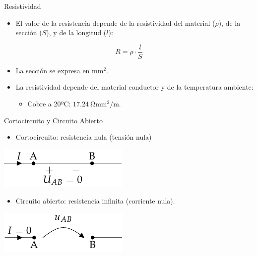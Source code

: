 \documentclass[xcolor={usenames,svgnames,dvipsnames}]{beamer}
\begin{document}
\begin{frame}[label={sec:org91b3831}]{Resistividad}
\begin{itemize}
\item El valor de la resistencia depende de la \alert{resistividad del material} (\(\rho\)), de la \alert{sección} (\(S\)), y de la
longitud (\(l\)):
\end{itemize}
\begin{equation*}
  R = \rho \cdot \frac{l}{S}
\end{equation*}

\begin{itemize}
\item La \alert{sección} se expresa en \(\si{\milli\meter\squared}\).

\item La \alert{resistividad} depende del material conductor y de la temperatura ambiente:

\begin{itemize}
\item Cobre a 20ºC: \(\SI{17.24}{\ohm\milli\meter\squared\per\meter}\).
\end{itemize}
\end{itemize}
\end{frame}

\begin{frame}[label={sec:org7a2adb9}]{Cortocircuito y Circuito Abierto}
\begin{itemize}
\item Cortocircuito: resistencia nula (tensión nula)
\end{itemize}

\begin{center}
\includegraphics[height=0.2\textheight]{figs/Cortocircuito.pdf}
\end{center}

\begin{itemize}
\item Circuito abierto: resistencia infinita (corriente nula).
\end{itemize}

\begin{center}
\includegraphics[height=0.2\textheight]{figs/CircuitoAbierto.pdf}
\end{center}
\end{frame}
\end{document}
